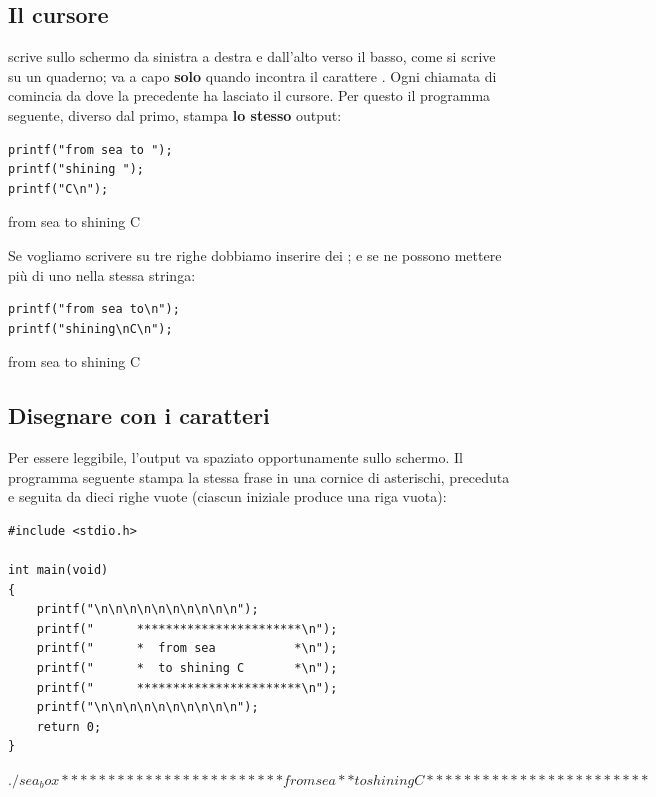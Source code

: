 \subsection{Il cursore}

 scrive sullo schermo da sinistra a destra e dall'alto verso
il basso, come si scrive su un quaderno; va a capo \textbf{solo} quando
incontra il carattere . Ogni chiamata di
 comincia da dove la precedente ha lasciato il cursore. Per
questo il programma seguente, diverso dal primo, stampa \textbf{lo stesso}
output:

\begin{affianco}[0.5][c]
\begin{lstlisting}[style=c]
printf("from sea to ");
printf("shining ");
printf("C\n");
\end{lstlisting}
\risultato
\begin{console}
from sea to shining C
\end{console}
\end{affianco}

Se vogliamo scrivere su tre righe dobbiamo inserire dei ; e se ne possono mettere più di uno nella stessa stringa:

\begin{affianco}[0.5][c]
\begin{lstlisting}[style=c]
printf("from sea to\n");
printf("shining\nC\n");
\end{lstlisting}
\risultato
\begin{console}
from sea to
shining
C
\end{console}
\end{affianco}

\subsection{Disegnare con i caratteri}

Per essere leggibile, l'output va spaziato opportunamente sullo schermo.
Il programma seguente stampa la stessa frase in una cornice di asterischi,
preceduta e seguita da dieci righe vuote (ciascun 
iniziale produce una riga vuota):

\begin{affianco}[0.58][c]
\begin{lstlisting}[style=c, name=sea_box.c]
#include <stdio.h>

int main(void)
{
    printf("\n\n\n\n\n\n\n\n\n\n");
    printf("      ***********************\n");
    printf("      *  from sea           *\n");
    printf("      *  to shining C       *\n");
    printf("      ***********************\n");
    printf("\n\n\n\n\n\n\n\n\n\n");
    return 0;
}
\end{lstlisting}
\risultato
\begin{console}
$ ./sea_box


      ***********************
      *  from sea           *
      *  to shining C       *
      ***********************


$
\end{console}
\end{affianco}

